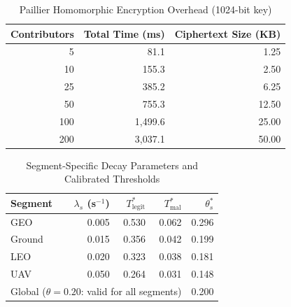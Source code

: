 \begin{table}[t]
\centering
\caption{Paillier Homomorphic Encryption Overhead (1024-bit key)}
\label{tab:crypto}
\begin{tabular}{rrr}
\toprule
Contributors & Total Time (ms) & Ciphertext Size (KB) \\
\midrule
  5  &   81.1 &  1.25 \\
 10  &  155.3 &  2.50 \\
 25  &  385.2 &  6.25 \\
 50  &  755.3 & 12.50 \\
100  & 1{,}499.6 & 25.00 \\
200  & 3{,}037.1 & 50.00 \\
\bottomrule
\end{tabular}
\end{table}

\begin{table}[t]
\centering
\caption{Segment-Specific Decay Parameters and Calibrated Thresholds}
\label{tab:lambda}
\begin{tabular}{lrrrr}
\toprule
Segment & $\lambda_s$ (s$^{-1}$) & $T^*_{\mathrm{legit}}$ &
          $T^*_{\mathrm{mal}}$ & $\theta^*_s$ \\
\midrule
GEO    & 0.005 & 0.530 & 0.062 & 0.296 \\
Ground & 0.015 & 0.356 & 0.042 & 0.199 \\
LEO    & 0.020 & 0.323 & 0.038 & 0.181 \\
UAV    & 0.050 & 0.264 & 0.031 & 0.148 \\
\midrule
\multicolumn{4}{l}{Global ($\theta=0.20$: valid for all segments)} & 0.200 \\
\bottomrule
\end{tabular}
\end{table}
